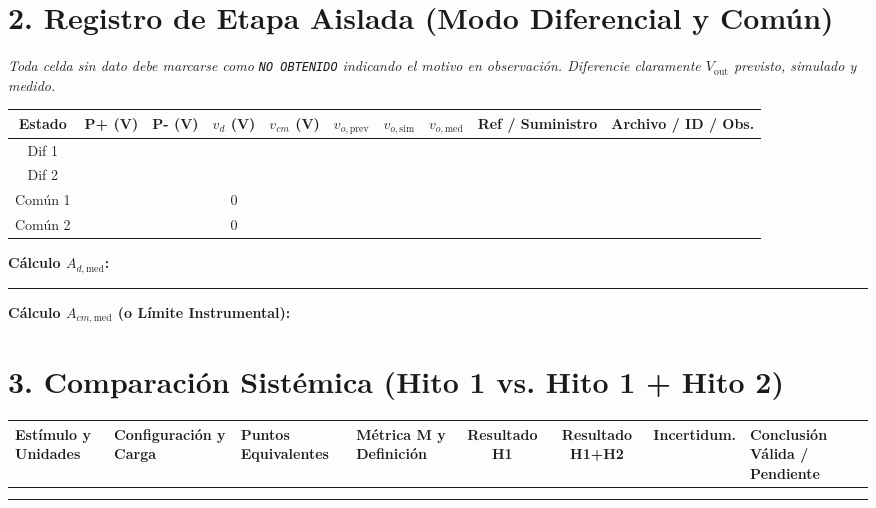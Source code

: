 \documentclass[10pt, a4paper]{article}
\begin{document}
\section*{2. Registro de Etapa Aislada (Modo Diferencial y Común)}
\textit{Toda celda sin dato debe marcarse como \texttt{NO OBTENIDO} indicando el motivo en observación. Diferencie claramente $V_{\mathrm{out}}$ previsto, simulado y medido.}

\begin{table}[htbp]
    \centering
    \scriptsize
    \renewcommand{\arraystretch}{1.35}
    \begin{tabularx}{\textwidth}{|c|c|c|c|c|c|c|c|P{2.5cm}|Y|}
    \hline
    \textbf{Estado} & \textbf{P+ (V)} & \textbf{P- (V)} & \textbf{$v_d$ (V)} & \textbf{$v_{cm}$ (V)} & \textbf{$v_{o,\mathrm{prev}}$} & \textbf{$v_{o,\mathrm{sim}}$} & \textbf{$v_{o,\mathrm{med}}$} & \textbf{Ref / Suministro} & \textbf{Archivo / ID / Obs.} \\ \hline
    Dif 1 & & & & & & & & & \\ \hline
    Dif 2 & & & & & & & & & \\ \hline
    Común 1 & & & 0 & & & & & & \\ \hline
    Común 2 & & & 0 & & & & & & \\ \hline
    \end{tabularx}
\end{table}
\noindent\textbf{Cálculo $A_{d,\mathrm{med}}$:} \rule{4cm}{0.4pt} \quad \textbf{Cálculo $A_{cm,\mathrm{med}}$ (o Límite Instrumental):} \hrulefill

\section*{3. Comparación Sistémica (Hito 1 vs. Hito 1 + Hito 2)}
\begin{table}[htbp]
    \centering
    \scriptsize
    \renewcommand{\arraystretch}{1.45}
    \begin{tabularx}{\textwidth}{|P{1.8cm}|P{1.8cm}|P{2.0cm}|P{2.2cm}|c|c|c|X|}
    \hline
    \textbf{Estímulo y Unidades} & \textbf{Configuración y Carga} & \textbf{Puntos Equivalentes} & \textbf{Métrica M y Definición} & \textbf{Resultado H1} & \textbf{Resultado H1+H2} & \textbf{Incertidum.} & \textbf{Conclusión Válida / Pendiente} \\ \hline
     & & & & & & & \\ \hline
     & & & & & & & \\ \hline
    \end{tabularx}
\end{table}
\end{document}
